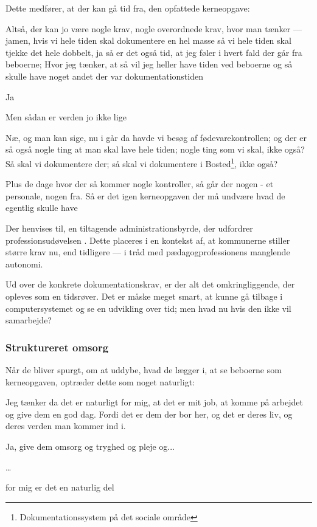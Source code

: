 Dette medfører, at der kan gå tid fra, den opfattede kerneopgave:
\begin{description}

\AMB
Altså, der kan jo være nogle krav, nogle overordnede krav, hvor man tænker — jamen, hvis vi hele tiden skal dokumentere en hel masse så vi hele tiden skal tjekke det hele dobbelt, ja så er det også tid, at jeg føler i hvert fald der går fra beboerne;
Hvor jeg tænker, at så vil jeg heller have tiden ved beboerne og så skulle have noget andet der var dokumentationstiden

\DMC
Ja

\AMB
Men sådan er verden jo ikke lige

\DMC
Næ, og man kan sige, nu i går da havde vi besøg af fødevarekontrollen; og der er så også nogle ting at man skal lave hele tiden; nogle ting som vi skal, ikke også?
Så skal vi dokumentere der; så skal vi dokumentere i Bosted\footnote{Dokumentationssystem på det sociale område}, ikke også?

\AMB
Plus de dage hvor der så kommer nogle kontroller, så går der nogen - et personale, nogen fra.
Så er det igen kerneopgaven der må undvære hvad de egentlig skulle have
\end{description}

Der henvises til, en tiltagende administrationsbyrde, der udfordrer professionsudøvelsen \autocite[s. 16]{mik-meyerIndledningSkabeProfessionel2012}.
Dette placeres i en kontekst af, at kommunerne stiller større krav nu, end tidligere — i tråd med pædagogprofessionens manglende autonomi.

Ud over de konkrete dokumentationskrav, er der alt det omkringliggende, der opleves som en tidsrøver.
Det er måske meget smart, at kunne gå tilbage i computersystemet og se en udvikling over tid; men hvad nu hvis den ikke vil samarbejde?

\subsubsection{Struktureret omsorg}
Når de bliver spurgt, om at uddybe, hvad de lægger i, at se beboerne som kerneopgaven, optræder dette som noget naturligt:

\begin{description}
\AMB
Jeg tænker da det er naturligt for mig, at det er mit job, at komme på arbejdet og give dem en god dag.
Fordi det er dem der bor her, og det er deres liv, og deres verden man kommer ind i.

\DMC
Ja, give dem omsorg og tryghed og pleje og...
\end{description}
\ldots
\begin{description}
\AMB
for mig er det en naturlig del
\end{description}

